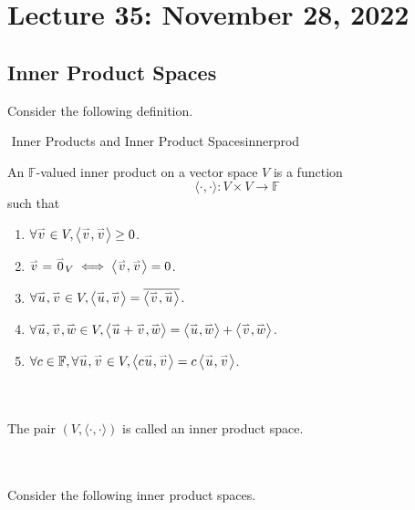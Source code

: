 \section{Lecture 35: November 28, 2022}

    \subsection{Inner Product Spaces}

        Consider the following definition.
        \begin{definition}{\Stop\,\,Inner Products and Inner Product Spaces}{innerprod}

            An \(\mathbb{F}\)-valued inner product on a vector space \(V\) is a function 
            \begin{equation*}
                \langle\cdot,\cdot\rangle:V\times V\to \mathbb{F}
            \end{equation*}
            such that
            \begin{enumerate}
                \item \(\forall\vec{v}\in V,\iprod{\vec{v}}{\vec{v}}\geq 0\).
                \item \(\vec{v}=\vec{0}_V\iff\iprod{\vec{v}}{\vec{v}}=0\).
                \item \(\forall\vec{u},\vec{v}\in V,\iprod{\vec{u}}{\vec{v}}=\bar{\iprod{\vec{v}}{\vec{u}}}\).
                \item \(\forall\vec{u},\vec{v},\vec{w}\in V,\iprod{\vec{u}+\vec{v}}{\vec{w}}=\iprod{\vec{u}}{\vec{w}}+\iprod{\vec{v}}{\vec{w}}\).
                \item \(\forall c\in\mathbb{F},\forall\vec{u},\vec{v}\in V,\iprod{c\vec{u}}{\vec{v}}=c\iprod{\vec{u}}{\vec{v}}\).
            \end{enumerate}
            \vphantom
            \\
            \\
            The pair \((V,\langle\cdot,\cdot\rangle)\) is called an inner product space.
            
        \end{definition}
        \pagebreak
        \vphantom
        \\
        \\
        Consider the following inner product spaces.

